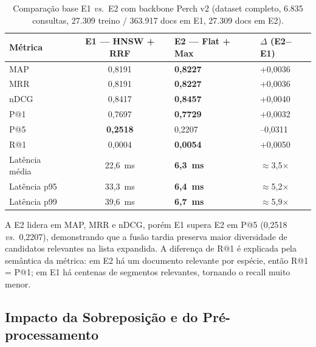 \documentclass[12pt,a4paper]{article}
\begin{document}
\begin{table}[htbp]
\centering
\caption{Comparação base E1 \emph{vs.}\ E2 com backbone Perch v2 (dataset completo,
6.835 consultas, 27.309 treino / 363.917 docs em E1, 27.309 docs em E2).}
\label{tab:base_full}
\begin{tabular}{lCC{2.0cm}C{2.0cm}}
\toprule
\textbf{Métrica} & \textbf{E1 --- HNSW + RRF} & \textbf{E2 --- Flat + Max} & \textbf{$\Delta$ (E2$-$E1)} \\
\midrule
MAP              & 0,8191 & \textbf{0,8227} & +0,0036 \\
MRR              & 0,8191 & \textbf{0,8227} & +0,0036 \\
nDCG             & 0,8417 & \textbf{0,8457} & +0,0040 \\
P@1              & 0,7697 & \textbf{0,7729} & +0,0032 \\
P@5              & \textbf{0,2518} & 0,2207 & --0,0311 \\
R@1              & 0,0004 & \textbf{0,0054} & +0,0050 \\
Latência média   & 22,6~ms & \textbf{6,3~ms} & $\approx$3,5$\times$ \\
Latência p95     & 33,3~ms & \textbf{6,4~ms} & $\approx$5,2$\times$ \\
Latência p99     & 39,6~ms & \textbf{6,7~ms} & $\approx$5,9$\times$ \\
\bottomrule
\end{tabular}
\end{table}

A E2 lidera em MAP, MRR e nDCG, porém E1 supera E2 em P@5 (0,2518 \emph{vs.}\
0,2207), demonstrando que a fusão tardia preserva maior diversidade de candidatos
relevantes na lista expandida. A diferença de R@1 é explicada pela semântica
da métrica: em E2 há um documento relevante por espécie, então R@1 = P@1; em
E1 há centenas de segmentos relevantes, tornando o recall muito menor.

\subsection{Impacto da Sobreposição e do Pré-processamento}
\end{document}

